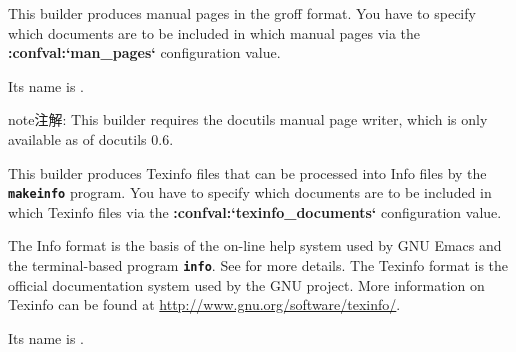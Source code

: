\documentclass[letterpaper,10pt,english]{sphinxmanual}
\begin{document}
\label{builders:module-sphinx.builders.manpage}

\begin{fulllineitems}
\label{builders:sphinx.builders.manpage.ManualPageBuilder}
This builder produces manual pages in the groff format.  You have to specify
which documents are to be included in which manual pages via the
{\color{red}\bfseries{}:confval:{}`man\_pages{}`} configuration value.

Its name is .

\begin{notice}{note}{注解:}
This builder requires the docutils manual page writer, which is only
available as of docutils 0.6.
\end{notice}


\end{fulllineitems}

\label{builders:module-sphinx.builders.texinfo}

\begin{fulllineitems}
\label{builders:sphinx.builders.texinfo.TexinfoBuilder}
This builder produces Texinfo files that can be processed into Info files by
the \textbf{\texttt{makeinfo}} program.  You have to specify which documents are to
be included in which Texinfo files via the {\color{red}\bfseries{}:confval:{}`texinfo\_documents{}`}
configuration value.

The Info format is the basis of the on-line help system used by GNU Emacs and
the terminal-based program \textbf{\texttt{info}}.  See {\hyperref[faq:texinfo\string-faq]{}} for more
details.  The Texinfo format is the official documentation system used by the
GNU project.  More information on Texinfo can be found at
\url{http://www.gnu.org/software/texinfo/}.

Its name is .


\end{fulllineitems}
\end{document}
